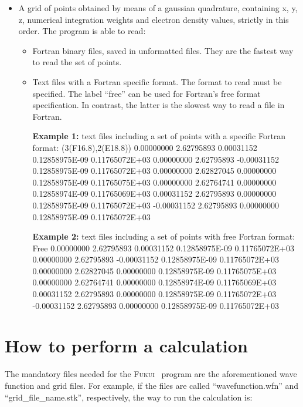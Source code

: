 \documentclass[a4paper,11pt,openany]{memoir}
\newcommand\programa{\textsc{Fukui}}
\begin{document}
\begin{itemize}
\begin{recuadro}{Cube file structure:}
  1.41965E-18  4.15287E-18  1.16752E-17  3.15458E-17  8.19189E-17  2.04457E-16
		\end{recuadro}
	\item A grid of points obtained by means of a gaussian quadrature, containing x, y, z, numerical integration weights and electron density values, strictly in this order. The program is able to read:
	\begin{itemize}
		\item Fortran binary files, saved in unformatted files. They are the fastest way to read the set of points.
		\item Text files with a Fortran specific format. The format to read must be specified. The label ``free'' can be used for Fortran's free format specification. In contrast, the latter is the slowest way to read a file in Fortran.
		\begin{recuadro}{\textbf{Example 1:} text files including a set of points with a specific Fortran format:}
(3(F16.8),2(E18.8))
      0.00000000      2.62795893      0.00031152    0.12858975E-09   0.11765072E+03
      0.00000000      2.62795893     -0.00031152    0.12858975E-09   0.11765072E+03
      0.00000000      2.62827045      0.00000000    0.12858975E-09   0.11765075E+03
      0.00000000      2.62764741      0.00000000    0.12858974E-09   0.11765069E+03
      0.00031152      2.62795893      0.00000000    0.12858975E-09   0.11765072E+03
     -0.00031152      2.62795893      0.00000000    0.12858975E-09   0.11765072E+03
		\end{recuadro}
		\begin{recuadro}{\textbf{Example 2:}  text files including a set of points with free Fortran format:}
Free
      0.00000000      2.62795893      0.00031152    0.12858975E-09   0.11765072E+03
      0.00000000      2.62795893     -0.00031152    0.12858975E-09   0.11765072E+03
      0.00000000      2.62827045      0.00000000    0.12858975E-09   0.11765075E+03
      0.00000000      2.62764741      0.00000000    0.12858974E-09   0.11765069E+03
      0.00031152      2.62795893      0.00000000    0.12858975E-09   0.11765072E+03
     -0.00031152      2.62795893      0.00000000    0.12858975E-09   0.11765072E+03
		\end{recuadro}
	\end{itemize}
\end{itemize}

\section{How to perform a calculation}
The mandatory files needed for the \programa~ program are the aforementioned wave function and grid files. For example, if the files are called ``wavefunction.wfn'' and ``grid\_file\_name.stk'', respectively, the way to run the calculation is:
\end{document}
